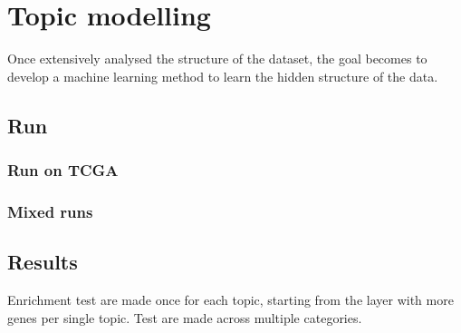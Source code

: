 \chapter{Topic modelling}\label{ch:topicmodelling}
Once extensively analysed the structure of the dataset, the goal becomes to develop a machine learning method to learn the hidden structure of the data.









\section{Run}




\subsection{Run on TCGA}

\subsection{Mixed runs}

\section{Results}


Enrichment test are made once for each topic, starting from the layer with more genes per 
single topic. Test are made across multiple categories.